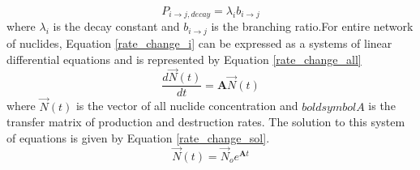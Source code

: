 \begin{equation}\label{decay_p_const}
  P_{i \rightarrow j, decay} = \lambda_{i} b_{i \rightarrow j}
\end{equation}
where $\lambda_{i}$ is the decay constant and $b_{i \rightarrow j}$ is
the branching ratio.For entire network of nuclides,
Equation \ref{rate_change_i} can be expressed as
a systems of linear differential equations and is represented by Equation
\ref{rate_change_all}
\begin{equation}\label{rate_change_all}
  \frac{d\vec{N}(t)}{dt} =\boldsymbol{A}  \vec{N}(t)
\end{equation}
where $\vec{N}(t)$ is the vector of all nuclide concentration and $boldsymbol{A}$
is the transfer matrix of production and destruction rates. The solution to this
system of equations is given by Equation \ref{rate_change_sol}.
\begin{equation}\label{rate_change_sol}
  \vec{N}(t) =\vec{N}_{o} e^{\boldsymbol{A}t}
\end{equation}

